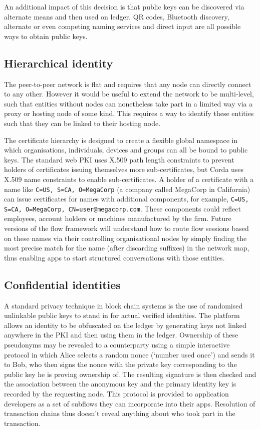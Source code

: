 \documentclass{article}
\begin{document}
An additional impact of this decision is that public keys can be discovered via alternate means and then used on
ledger. QR codes, Bluetooth discovery, alternate or even competing naming services and direct input are all
possible ways to obtain public keys.

\subsection{Hierarchical identity}\label{subsec:hierarchical-identity}

The peer-to-peer network is flat and requires that any node can directly connect to any other. However it would be
useful to extend the network to be multi-level, such that entities without nodes can nonetheless take part in a
limited way via a proxy or hosting node of some kind. This requires a way to identify these entities such that they
can be linked to their hosting node.

The certificate hierarchy is designed to create a flexible global namespace in which organisations, individuals,
devices and groups can all be bound to public keys. The standard web PKI uses X.509 path length constraints to
prevent holders of certificates issuing themselves more sub-certificates, but Corda uses X.509 name constraints to
enable sub-certificates. A holder of a certificate with a name like \texttt{C=US, S=CA, O=MegaCorp} (a company
called MegaCorp in California) can issue certificates for names with additional components, for example,
\texttt{C=US, S=CA, O=MegaCorp, CN=user@megacorp.com}. These components could reflect employees, account holders or
machines manufactured by the firm. Future versions of the flow framework will understand how to route flow sessions
based on these names via their controlling organisational nodes by simply finding the most precise match for the
name (after discarding suffixes) in the network map, thus enabling apps to start structured conversations with
those entities.

\subsection{Confidential identities}\label{subsec:confidential-identities}

A standard privacy technique in block chain systems is the use of randomised unlinkable public keys to stand in for
actual verified identities. The platform allows an identity to be obfuscated on the ledger by generating keys not
linked anywhere in the PKI and then using them in the ledger. Ownership of these pseudonyms may be revealed to a
counterparty using a simple interactive protocol in which Alice selects a random nonce (`number used once') and
sends it to Bob, who then signs the nonce with the private key corresponding to the public key he is proving
ownership of. The resulting signature is then checked and the association between the anonymous key and the primary
identity key is recorded by the requesting node. This protocol is provided to application developers as a set of
subflows they can incorporate into their apps. Resolution of transaction chains thus doesn't reveal anything about
who took part in the transaction.
\end{document}
